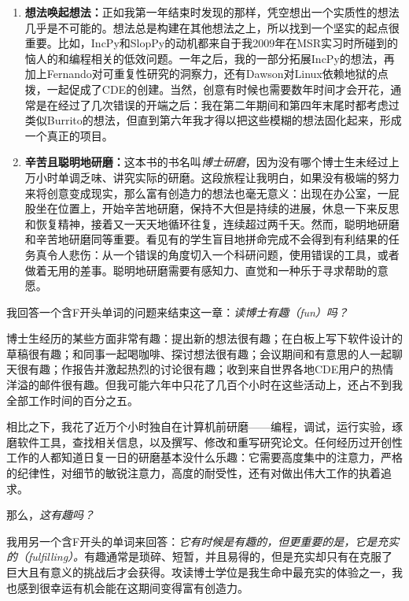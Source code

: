 \documentclass[12pt,UTF8,nofonts]{book}
\newcommand{\bookname}{博士研磨}
\begin{document}
\begin{enumerate}
  \item \textbf{想法唤起想法：}正如我第一年结束时发现的那样，凭空想出一个实质性的想法几乎是不可能的。想法总是构建在其他想法之上，所以找到一个坚实的起点很重要。比如，IncPy和SlopPy的动机都来自于我2009年在MSR实习时所碰到的恼人的和编程相关的低效问题。一年之后，我的一部分拓展IncPy的想法，再加上Fernando对可重复性研究的洞察力，还有Dawson对Linux依赖地狱的点拨，一起促成了CDE的创建。当然，创意有时候也需要数年时间才会开花，通常是在经过了几次错误的开端之后：我在第二年期间和第四年末尾时都考虑过类似Burrito的想法，但直到第六年我才得以把这些模糊的想法固化起来，形成一个真正的项目。
  \item \textbf{辛苦且聪明地研磨：}这本书的书名叫\emph{\bookname}，因为没有哪个博士生未经过上万小时单调乏味、讲究实际的研磨。这段旅程让我明白，如果没有极端的努力来将创意变成现实，那么富有创造力的想法也毫无意义：出现在办公室，一屁股坐在位置上，开始辛苦地研磨，保持不大但是持续的进展，休息一下来反思和恢复精神，接着又一天天地循环往复，连续超过两千天。然而，聪明地研磨和辛苦地研磨同等重要。看见有的学生盲目地拼命完成不会得到有利结果的任务真令人悲伤：从一个错误的角度切入一个科研问题，使用错误的工具，或者做着无用的差事。聪明地研磨需要有感知力、直觉和一种乐于寻求帮助的意愿。
\end{enumerate}

\breakline

我回答一个含F开头单词的问题来结束这一章：\emph{读博士有趣（fun）吗？}

博士生经历的某些方面非常有趣：提出新的想法很有趣；在白板上写下软件设计的草稿很有趣；和同事一起喝咖啡、探讨想法很有趣；会议期间和有意思的人一起聊天很有趣；作报告并激起热烈的讨论很有趣；收到来自世界各地CDE用户的热情洋溢的邮件很有趣。但我可能六年中只花了几百个小时在这些活动上，还占不到我全部工作时间的百分之五。

相比之下，我花了近万个小时独自在计算机前研磨——编程，调试，运行实验，琢磨软件工具，查找相关信息，以及撰写、修改和重写研究论文。任何经历过开创性工作的人都知道日复一日的研磨基本没什么乐趣：它需要高度集中的注意力，严格的纪律性，对细节的敏锐注意力，高度的耐受性，还有对做出伟大工作的执着追求。

那么，\emph{这有趣吗？}

我用另一个含F开头的单词来回答：\emph{它有时候是有趣的，但更重要的是，它是充实的（fulfilling）。}有趣通常是琐碎、短暂，并且易得的，但是充实却只有在克服了巨大且有意义的挑战后才会获得。攻读博士学位是我生命中最充实的体验之一，我也感到很幸运有机会能在这期间变得富有创造力。
\end{document}

